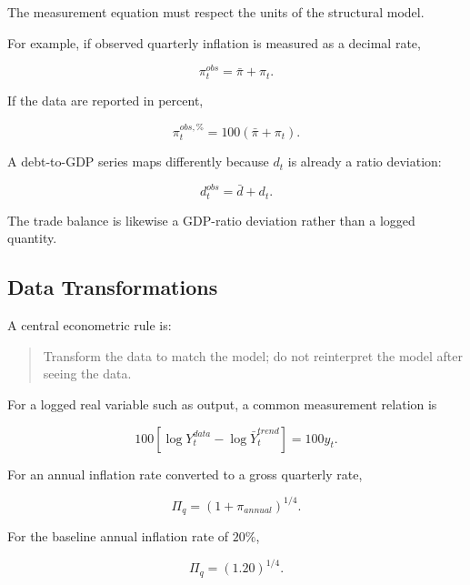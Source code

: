 The measurement equation must respect the units of the structural model.

For example, if observed quarterly inflation is measured as a decimal rate,

\begin{equation}
\pi_t^{obs}
=
\bar\pi+\pi_t.
\end{equation}

If the data are reported in percent,

\begin{equation}
\pi_t^{obs,\%}
=
100(\bar\pi+\pi_t).
\end{equation}

A debt-to-GDP series maps differently because \(d_t\) is already a ratio
deviation:

\begin{equation}
d_t^{obs}
=
\bar d+d_t.
\end{equation}

The trade balance is likewise a GDP-ratio deviation rather than a logged
quantity.

\subsection{Data Transformations}
\label{app:data_transformations}

A central econometric rule is:

\begin{quote}
Transform the data to match the model; do not reinterpret the model after
seeing the data.
\end{quote}

For a logged real variable such as output, a common measurement relation is

\begin{equation}
100\left[
\log Y_t^{data}
-
\log \bar Y_t^{trend}
\right]
=
100y_t.
\end{equation}

For an annual inflation rate converted to a gross quarterly rate,

\begin{equation}
\Pi_q
=
(1+\pi_{annual})^{1/4}.
\end{equation}

For the baseline annual inflation rate of \(20\%\),

\begin{equation}
\Pi_q=(1.20)^{1/4}.
\end{equation}


